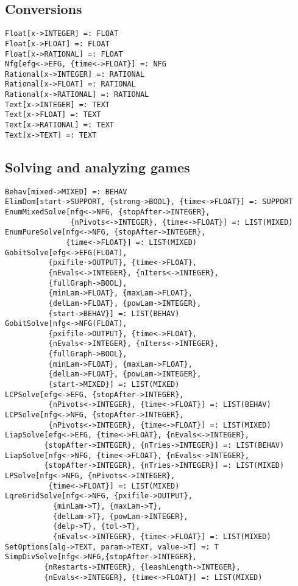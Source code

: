 \subsection{Conversions}

\begin{verbatim}
Float[x->INTEGER] =: FLOAT
Float[x->FLOAT] =: FLOAT
Float[x->RATIONAL] =: FLOAT
Nfg[efg<->EFG, {time<->FLOAT}] =: NFG
Rational[x->INTEGER] =: RATIONAL
Rational[x->FLOAT] =: RATIONAL
Rational[x->RATIONAL] =: RATIONAL
Text[x->INTEGER] =: TEXT
Text[x->FLOAT] =: TEXT
Text[x->RATIONAL] =: TEXT
Text[x->TEXT] =: TEXT
\end{verbatim}

\subsection{Solving and analyzing games}

\begin{verbatim}
Behav[mixed->MIXED] =: BEHAV
ElimDom[start->SUPPORT, {strong->BOOL}, {time<->FLOAT}] =: SUPPORT 
EnumMixedSolve[nfg<->NFG, {stopAfter->INTEGER},
               {nPivots<->INTEGER}, {time<->FLOAT}] =: LIST(MIXED)
EnumPureSolve[nfg<->NFG, {stopAfter->INTEGER}, 
              {time<->FLOAT}] =: LIST(MIXED) 
GobitSolve[efg<->EFG(FLOAT),
          {pxifile->OUTPUT}, {time<->FLOAT},
          {nEvals<->INTEGER}, {nIters<->INTEGER},
          {fullGraph->BOOL},
          {minLam->FLOAT}, {maxLam->FLOAT}, 
          {delLam->FLOAT}, {powLam->INTEGER}, 
          {start->BEHAV}] =: LIST(BEHAV)
GobitSolve[nfg<->NFG(FLOAT),
          {pxifile->OUTPUT}, {time<->FLOAT},
          {nEvals<->INTEGER}, {nIters<->INTEGER},
          {fullGraph->BOOL},
          {minLam->FLOAT}, {maxLam->FLOAT}, 
          {delLam->FLOAT}, {powLam->INTEGER}, 
          {start->MIXED}] =: LIST(MIXED)
LCPSolve[efg<->EFG, {stopAfter->INTEGER},
          {nPivots<->INTEGER}, {time<->FLOAT}] =: LIST(BEHAV)
LCPSolve[nfg<->NFG, {stopAfter->INTEGER},
          {nPivots<->INTEGER}, {time<->FLOAT}] =: LIST(MIXED)
LiapSolve[efg<->EFG, {time<->FLOAT}, {nEvals<->INTEGER},
         {stopAfter->INTEGER}, {nTries->INTEGER}] =: LIST(BEHAV)
LiapSolve[nfg<->NFG, {time<->FLOAT}, {nEvals<->INTEGER},
         {stopAfter->INTEGER}, {nTries->INTEGER}] =: LIST(MIXED)
LPSolve[nfg<->NFG, {nPivots<->INTEGER},
          {time<->FLOAT}] =: LIST(MIXED)
LqreGridSolve[nfg<->NFG, {pxifile->OUTPUT},
           {minLam->T}, {maxLam->T}, 
           {delLam->T}, {powLam->INTEGER}, 
           {delp->T}, {tol->T},
           {nEvals<->INTEGER}, {time<->FLOAT}] =: LIST(MIXED)
SetOptions[alg->TEXT, param->TEXT, value->T] =: T
SimpDivSolve[nfg<->NFG,{stopAfter->INTEGER}, 
         {nRestarts->INTEGER}, {leashLength->INTEGER},
         {nEvals<->INTEGER}, {time<->FLOAT}] =: LIST(MIXED)
\end{verbatim}

